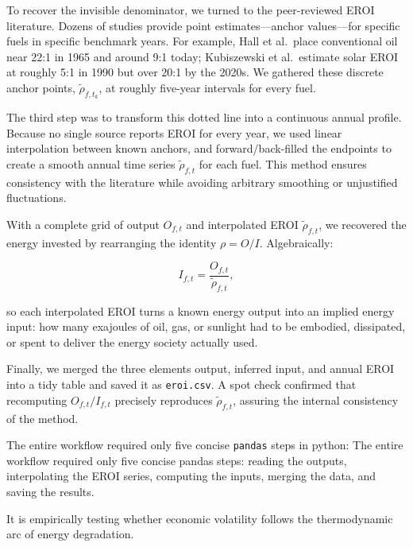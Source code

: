 \documentclass[a4paper,12pt]{article}
\begin{document}
To recover the invisible denominator, we turned to the peer-reviewed EROI literature. Dozens of studies provide point estimates—anchor values—for specific fuels in specific benchmark years. For example, Hall et al.\ place conventional oil near 22:1 in 1965 and around 9:1 today; Kubiszewski et al.\ estimate solar EROI at roughly 5:1 in 1990 but over 20:1 by the 2020s. We gathered these discrete anchor points, $\tilde{\rho}_{f,t_k}$, at roughly five-year intervals for every fuel.

The third step was to transform this dotted line into a continuous annual profile. Because no single source reports EROI for every year, we used linear interpolation between known anchors, and forward/back-filled the endpoints to create a smooth annual time series $\tilde{\rho}_{f,t}$ for each fuel. This method ensures consistency with the literature while avoiding arbitrary smoothing or unjustified fluctuations.

With a complete grid of output $O_{f,t}$ and interpolated EROI $\tilde{\rho}_{f,t}$, we recovered the energy invested by rearranging the identity $\rho = O/I$. Algebraically:

\[
    I_{f,t} = \frac{O_{f,t}}{\tilde{\rho}_{f,t}},
\]

so each interpolated EROI turns a known energy output into an implied energy input: how many exajoules of oil, gas, or sunlight had to be embodied, dissipated, or spent to deliver the energy society actually used.

Finally, we merged the three elements output, inferred input, and annual EROI into a tidy table and saved it as \texttt{eroi.csv}. A spot check confirmed that recomputing $O_{f,t} / I_{f,t}$ precisely reproduces $\tilde{\rho}_{f,t}$, assuring the internal consistency of the method.

The entire workflow required only five concise \texttt{pandas} steps in python:
The entire workflow required only five concise pandas steps: reading the outputs, interpolating the EROI series, computing the inputs, merging the data, and saving the results.

It is empirically testing whether economic volatility follows the thermodynamic arc of energy degradation.
\end{document}
